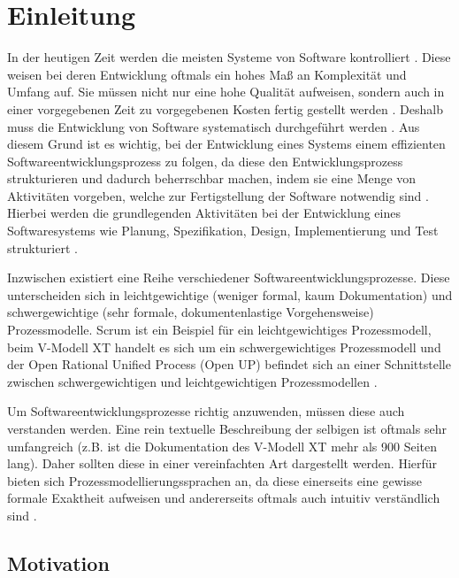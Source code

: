 \chapter{Einleitung}\label{sec:chapter1}

In der heutigen Zeit werden die meisten Systeme von Software kontrolliert \cite{Puntambekar2007}. Diese weisen bei deren Entwicklung oftmals ein hohes Maß an Komplexität und Umfang auf. Sie müssen nicht nur eine hohe Qualität aufweisen, sondern auch in einer vorgegebenen Zeit zu vorgegebenen Kosten fertig gestellt werden \cite{Grechenig2010}. Deshalb muss die Entwicklung von Software systematisch durchgeführt werden \cite{gumm2012einfuhrung}. Aus diesem Grund ist es wichtig, bei der Entwicklung eines Systems einem effizienten Softwareentwicklungsprozess zu folgen, da diese den Entwicklungsprozess strukturieren und dadurch beherrschbar machen, indem sie eine Menge von Aktivitäten vorgeben, welche zur Fertigstellung der Software notwendig sind \cite{richling2011autonomie}. Hierbei werden die grundlegenden Aktivitäten bei der Entwicklung eines Softwaresystems wie Planung, Spezifikation, Design, Implementierung und Test strukturiert \cite{gumm2012einfuhrung, Hanser2010}. \newline

Inzwischen existiert eine Reihe verschiedener Softwareentwicklungsprozesse. Diese unterscheiden sich in leichtgewichtige (weniger formal, kaum Dokumentation) und schwergewichtige (sehr formale, dokumentenlastige Vorgehensweise) Prozessmodelle. Scrum ist ein Beispiel für ein leichtgewichtiges Prozessmodell, beim V-Modell XT handelt es sich um ein schwergewichtiges Prozessmodell und der Open Rational Unified Process (Open UP) befindet sich an einer Schnittstelle zwischen schwergewichtigen und leichtgewichtigen Prozessmodellen \cite{Hanser2010}.\newline

Um Softwareentwicklungsprozesse richtig anzuwenden, müssen diese auch verstanden werden. Eine rein textuelle Beschreibung der selbigen ist oftmals sehr umfangreich (z.B. ist die Dokumentation des V-Modell XT mehr als 900 Seiten lang). Daher sollten diese in einer vereinfachten Art dargestellt werden. Hierfür bieten sich Prozessmodellierungssprachen an, da diese einerseits eine gewisse formale Exaktheit aufweisen und andererseits oftmals auch intuitiv verständlich sind \cite{thomas2009,kircher2006}. \newline

\section{Motivation}



